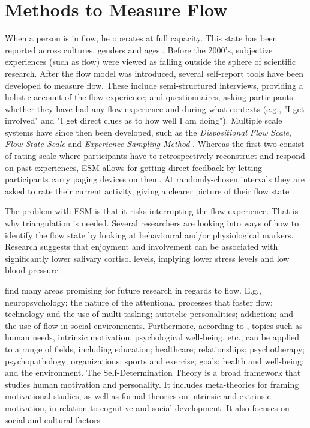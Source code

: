 \section{Methods to Measure Flow}
When a person is in flow, he operates at full capacity. This state has been reported across cultures, genders and ages \citep{flowTwo}. Before the 2000's, subjective experiences (such as flow) were viewed as falling outside the sphere of scientific research. After the flow model was introduced, several self-report tools have been developed to measure flow. These include semi-structured interviews, providing a holistic account of the flow experience; and questionnaires, asking participants whether they have had any flow experience and during what contexts (e.g., "I get involved" and "I get direct clues as to how well I am doing"). Multiple scale systems have since then been developed, such as the \textit{Dispositional Flow Scale}, \textit{Flow State Scale} and \textit{Experience Sampling Method} \citep{flowTwo}. Whereas the first two consist of rating scale where participants have to retrospectively reconstruct and respond on past experiences, ESM allows for getting direct feedback by letting participants carry paging devices on them. At randomly-chosen intervals they are asked to rate their current activity, giving a clearer picture of their flow state \citep{flowTwo}.

The problem with ESM is that it risks interrupting the flow experience. That is why triangulation is needed. Several researchers are looking into ways of how to identify the flow state by looking at behavioural and/or physiological markers. Research suggests that enjoyment and involvement can be associated with significantly lower salivary cortisol levels, implying lower stress levels and low blood pressure \citep{flowTwo}.

\cite{flowTwo} find many areas promising for future research in regards to flow. E.g., neuropsychology; the nature of the attentional processes that foster flow; technology and the use of multi-tasking; autotelic personalities; addiction; and the use of flow in social environments. Furthermore, according to \cite{sdt_website}, topics such as human needs, intrinsic motivation, psychological well-being, etc., can be applied to a range of fields, including education; healthcare; relationships; psychotherapy; psychopathology; organizations; sports and exercise; goals; health and well-being; and the environment. The Self-Determination Theory is a broad framework that studies human motivation and personality. It includes meta-theories for framing motivational studies, as well as formal theories on intrinsic and extrinsic motivation, in relation to cognitive and social development. It also focuses on social and cultural factors \citep{sdt_website}.